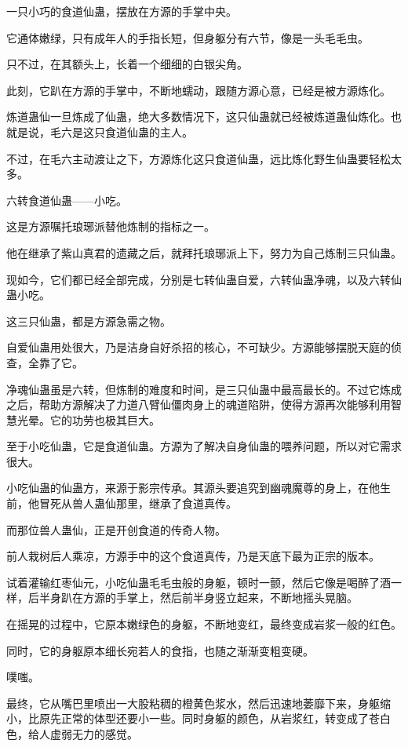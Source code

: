 
\begin{this_body}

一只小巧的食道仙蛊，摆放在方源的手掌中央。

它通体嫩绿，只有成年人的手指长短，但身躯分有六节，像是一头毛毛虫。

只不过，在其额头上，长着一个细细的白银尖角。

此刻，它趴在方源的手掌中，不断地蠕动，跟随方源心意，已经是被方源炼化。

炼道蛊仙一旦炼成了仙蛊，绝大多数情况下，这只仙蛊就已经被炼道蛊仙炼化。也就是说，毛六是这只食道仙蛊的主人。

不过，在毛六主动渡让之下，方源炼化这只食道仙蛊，远比炼化野生仙蛊要轻松太多。

六转食道仙蛊——小吃。

这是方源嘱托琅琊派替他炼制的指标之一。

他在继承了紫山真君的遗藏之后，就拜托琅琊派上下，努力为自己炼制三只仙蛊。

现如今，它们都已经全部完成，分别是七转仙蛊自爱，六转仙蛊净魂，以及六转仙蛊小吃。

这三只仙蛊，都是方源急需之物。

自爱仙蛊用处很大，乃是洁身自好杀招的核心，不可缺少。方源能够摆脱天庭的侦查，全靠了它。

净魂仙蛊虽是六转，但炼制的难度和时间，是三只仙蛊中最高最长的。不过它炼成之后，帮助方源解决了力道八臂仙僵肉身上的魂道陷阱，使得方源再次能够利用智慧光晕。它的功劳也极其巨大。

至于小吃仙蛊，它是食道仙蛊。方源为了解决自身仙蛊的喂养问题，所以对它需求很大。

小吃仙蛊的仙蛊方，来源于影宗传承。其源头要追究到幽魂魔尊的身上，在他生前，他冒死从兽人蛊仙那里，继承了食道真传。

而那位兽人蛊仙，正是开创食道的传奇人物。

前人栽树后人乘凉，方源手中的这个食道真传，乃是天底下最为正宗的版本。

试着灌输红枣仙元，小吃仙蛊毛毛虫般的身躯，顿时一颤，然后它像是喝醉了酒一样，后半身趴在方源的手掌上，然后前半身竖立起来，不断地摇头晃脑。

在摇晃的过程中，它原本嫩绿色的身躯，不断地变红，最终变成岩浆一般的红色。

同时，它的身躯原本细长宛若人的食指，也随之渐渐变粗变硬。

噗嗤。

最终，它从嘴巴里喷出一大股粘稠的橙黄色浆水，然后迅速地萎靡下来，身躯缩小，比原先正常的体型还要小一些。同时身躯的颜色，从岩浆红，转变成了苍白色，给人虚弱无力的感觉。


\end{this_body}
